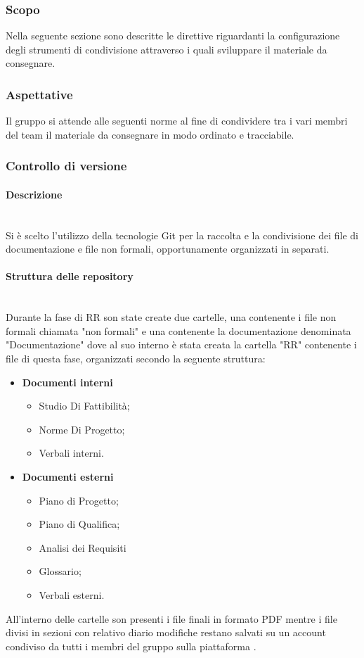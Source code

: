 \subsubsection{Scopo}
Nella seguente sezione sono descritte le direttive riguardanti la configurazione degli strumenti di condivisione attraverso i quali sviluppare il materiale da consegnare.



\subsubsection{Aspettative}
Il gruppo si attende alle seguenti norme al fine di condividere tra i vari membri del team il materiale da consegnare in modo ordinato e tracciabile.




\subsubsection{Controllo di versione}
\paragraph{Descrizione}
~\\Si è scelto l'utilizzo della tecnologie Git per la raccolta e la condivisione dei file di documentazione e file non formali, opportunamente organizzati in  separati.

\paragraph{Struttura delle repository}
~\\Durante la fase di RR son state create due cartelle, una contenente i file non formali chiamata "non formali" e una contenente la documentazione denominata "Documentazione" dove al suo interno è stata creata la cartella "RR" contenente i file di questa fase, organizzati secondo la seguente struttura:
\begin{itemize}
    \item \textbf{Documenti interni}
    \begin{itemize}
        \item Studio Di Fattibilità;
        \item Norme Di Progetto;
        \item Verbali interni.
    \end{itemize}
    \item \textbf{Documenti esterni}
    \begin{itemize}
        \item Piano di Progetto;
         \item Piano di Qualifica;
        \item Analisi dei Requisiti
        \item Glossario;
        \item Verbali esterni.
    \end{itemize}
\end{itemize}
All'interno delle cartelle son presenti i file finali in formato PDF  mentre i file  divisi in sezioni con relativo diario modifiche restano salvati su un account condiviso da tutti i membri del gruppo sulla piattaforma .
